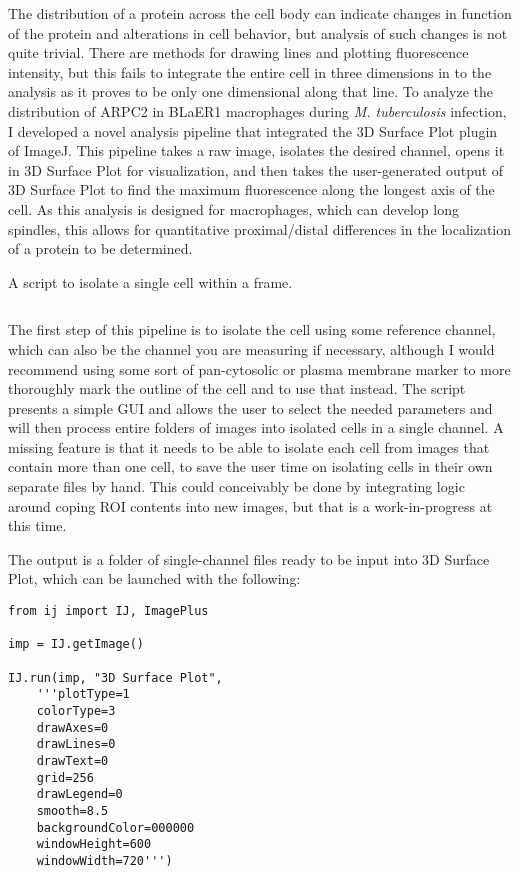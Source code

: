 The distribution of a protein across the cell body can indicate changes in function of the protein and alterations in cell behavior, but analysis of such changes is not quite trivial. There are methods for drawing lines and plotting fluorescence intensity, but this fails to integrate the entire cell in three dimensions in to the analysis as it proves to be only one dimensional along that line. To analyze the distribution of ARPC2 in BLaER1 macrophages during \textit{M. tuberculosis} infection, I developed a novel analysis pipeline that integrated the 3D Surface Plot plugin of ImageJ. This pipeline takes a raw image, isolates the desired channel, opens it in 3D Surface Plot for visualization, and then takes the user-generated output of 3D Surface Plot to find the maximum fluorescence along the longest axis of the cell. As this analysis is designed for macrophages, which can develop long spindles, this allows for quantitative proximal/distal differences in the localization of a protein to be determined.

\begin{code}
\caption{A script to isolate a single cell within a frame.}
\label{isolator}

\inputminted[breaklines,frame=single,fontsize=\small]{python}{source/autoIsolator.py}

\end{code}

The first step of this pipeline is to isolate the cell using some reference channel, which can also be the channel you are measuring if necessary, although I would recommend using some sort of pan-cytosolic or plasma membrane marker to more thoroughly mark the outline of the cell and to use that instead. The script presents a simple GUI and allows the user to select the needed parameters and will then process entire folders of images into isolated cells in a single channel. A missing feature is that it needs to be able to isolate each cell from images that contain more than one cell, to save the user time on isolating cells in their own separate files by hand. This could conceivably be done by integrating logic around coping ROI contents into new images, but that is a work-in-progress at this time.

The output is a folder of single-channel files ready to be input into 3D Surface Plot, which can be launched with the following:

\begin{code}
\begin{verbatim}
from ij import IJ, ImagePlus

imp = IJ.getImage()

IJ.run(imp, "3D Surface Plot", 
    '''plotType=1 
    colorType=3 
    drawAxes=0 
    drawLines=0 
    drawText=0 
    grid=256 
    drawLegend=0 
    smooth=8.5 
    backgroundColor=000000 
    windowHeight=600 
    windowWidth=720''')
\end{verbatim}
\end{code}

